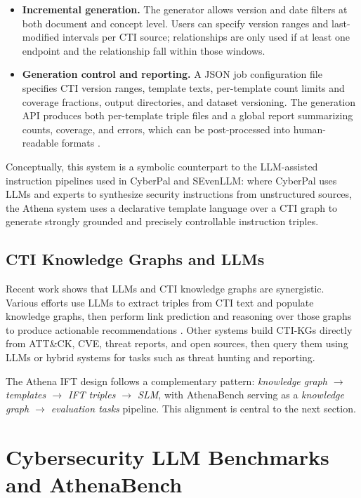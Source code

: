 \documentclass[unnumsec,webpdf,contemporary,large]{oup-authoring-template}
\theoremstyle{thmstyleone}
\theoremstyle{thmstyletwo}
\theoremstyle{thmstylethree}
\begin{document}
\begin{itemize}
  \item \textbf{Incremental generation.} The generator allows version and date filters at both document and concept level. Users can specify version ranges and last-modified intervals per CTI source; relationships are only used if at least one endpoint and the relationship fall within those windows.
  \item \textbf{Generation control and reporting.} A JSON job configuration file specifies CTI version ranges, template texts, per-template count limits and coverage fractions, output directories, and dataset versioning. The generation API produces both per-template triple files and a global report summarizing counts, coverage, and errors, which can be post-processed into human-readable formats \cite{cardei2025ift}.
\end{itemize}

Conceptually, this system is a symbolic counterpart to the LLM-assisted instruction pipelines used in CyberPal and SEvenLLM: where CyberPal uses LLMs and experts to synthesize security instructions from unstructured sources, the Athena system uses a declarative template language over a CTI graph to generate strongly grounded and precisely controllable instruction triples.

\subsection{CTI Knowledge Graphs and LLMs}

Recent work shows that LLMs and CTI knowledge graphs are synergistic. Various efforts use LLMs to extract triples from CTI text and populate knowledge graphs, then perform link prediction and reasoning over those graphs to produce actionable recommendations \cite{fieblinger2024kg,zhang2023cyberkg,wu2022opencykg,yu2024ctikg,zhao2024kctiaa}. Other systems build CTI-KGs directly from ATT\&CK, CVE, threat reports, and open sources, then query them using LLMs or hybrid systems for tasks such as threat hunting and reporting.

The Athena IFT design follows a complementary pattern: \emph{knowledge graph $\rightarrow$ templates $\rightarrow$ IFT triples $\rightarrow$ SLM}, with AthenaBench serving as a \emph{knowledge graph $\rightarrow$ evaluation tasks} pipeline. This alignment is central to the next section.

\section{Cybersecurity LLM Benchmarks and AthenaBench}
\label{sec:benchmarks}
\end{document}

